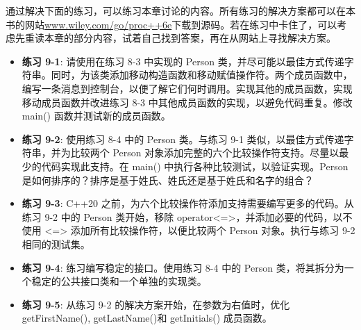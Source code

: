 
通过解决下面的练习，可以练习本章讨论的内容。所有练习的解决方案都可以在本书的网站\url{www.wiley.com/go/proc++6e}下载到源码。若在练习中卡住了，可以考虑先重读本章的部分内容，试着自己找到答案，再在从网站上寻找解决方案。

\begin{itemize}
\item
\textbf{练习 9-1}: 请使用在练习 8-3 中实现的 Person 类，并尽可能以最佳方式传递字符串。同时，为该类添加移动构造函数和移动赋值操作符。两个成员函数中，编写一条消息到控制台，以便了解它们何时调用。实现其他的成员函数，实现移动成员函数并改进练习 8-3 中其他成员函数的实现，以避免代码重复。修改 main() 函数并测试新的成员函数。

\item
\textbf{练习 9-2}: 使用练习 8-4 中的 Person 类。与练习 9-1 类似，以最佳方式传递字符串，并为比较两个 Person 对象添加完整的六个比较操作符支持。尽量以最少的代码实现此支持。在 main() 中执行各种比较测试，以验证实现。Person 是如何排序的？排序是基于姓氏、姓氏还是基于姓氏和名字的组合？

\item
\textbf{练习 9-3}:  C++20 之前，为六个比较操作符添加支持需要编写更多的代码。从练习 9-2 中的 Person 类开始，移除 operator<=>，并添加必要的代码，以不使用 <=> 添加所有比较操作符，以便比较两个 Person 对象。执行与练习 9-2 相同的测试集。

\item
\textbf{练习 9-4}: 练习编写稳定的接口。使用练习 8-4 中的 Person 类，将其拆分为一个稳定的公共接口类和一个单独的实现类。

\item
\textbf{练习 9-5}: 从练习 9-2 的解决方案开始，在参数为右值时，优化 getFirstName(), getLastName()和 getInitials() 成员函数。
\end{itemize}






